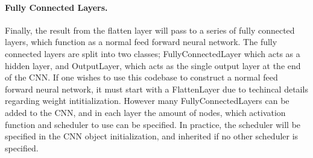 \documentclass[%
oneside,                 %
final,                   %
10pt]{article}
\begin{document}
\paragraph{Fully Connected Layers.}
Finally, the result from the flatten layer will pass to a series of
fully connected layers, which function as a normal feed forward neural
network. The fully connected layers are split into two classes;
FullyConnectedLayer which acts as a hidden layer, and OutputLayer,
which acts as the single output layer at the end of the CNN. If one
wishes to use this codebase to construct a normal feed forward neural
network, it must start with a FlattenLayer due to techincal details
regarding weight intitialization. However many FullyConnectedLayers
can be added to the CNN, and in each layer the amount of nodes, which
activation function and scheduler to use can be specified. In
practice, the scheduler will be specified in the CNN object
initialization, and inherited if no other scheduler is specified.
\end{document}
